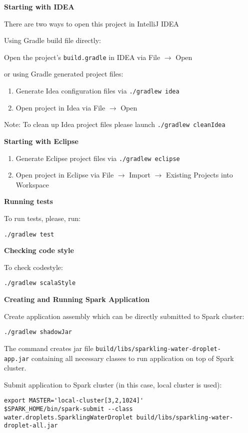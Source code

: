 \textbf{Starting with IDEA}

There are two ways to open this project in IntelliJ IDEA

Using Gradle build file directly:

\quad Open the project's \texttt{build.gradle} in IDEA via File $\rightarrow$ Open

or using Gradle generated project files:

\begin{enumerate}
\item Generate Idea configuration files via  {\lstinline[style=Bash]|./gradlew idea|} 
\item Open project in Idea via File $\rightarrow$ Open
\end{enumerate}

Note: To clean up Idea project files please launch {\lstinline[style=Bash]|./gradlew cleanIdea|} 

\textbf{Starting with Eclipse}

\begin{enumerate}
\item Generate Eclipse project files via {\lstinline[style=Bash]|./gradlew eclipse|} 
\item Open project in Eclipse via File $\rightarrow$ Import $\rightarrow$ Existing Projects into Workspace
\end{enumerate}

\textbf{Running tests}

To run tests, please, run:

\begin{lstlisting}[style=Bash]
./gradlew test
\end{lstlisting}

\textbf{Checking code style}

To check codestyle:

\begin{lstlisting}[style=Bash]
./gradlew scalaStyle
\end{lstlisting}

\textbf{Creating and Running Spark Application}

Create application assembly which can be directly submitted to Spark cluster:

\begin{lstlisting}[style=Bash]
./gradlew shadowJar
\end{lstlisting}

The command creates jar file \texttt{build/libs/sparkling-water-droplet-}\\
\texttt{app.jar} containing all necessary classes to run application on top of Spark cluster.

Submit application to Spark cluster (in this case, local cluster is used):

\begin{lstlisting}[style=Bash]
export MASTER='local-cluster[3,2,1024]'
$SPARK_HOME/bin/spark-submit --class water.droplets.SparklingWaterDroplet build/libs/sparkling-water-droplet-all.jar
\end{lstlisting}


